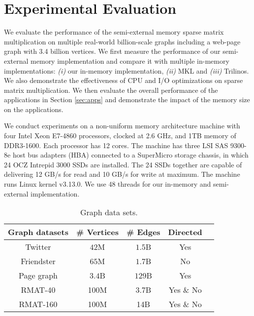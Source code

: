 \section{Experimental Evaluation}

We evaluate the performance of the semi-external memory sparse matrix
multiplication on multiple real-world billion-scale graphs including a web-page
graph with 3.4 billion vertices. We first measure the performance of our
semi-external memory implementation and compare it with multiple in-memory
implementations: \textit{(i)} our in-memory implementation, \textit{(ii)} MKL
and \textit{(iii)} Trilinos. We also demonstrate the effectiveness of
CPU and I/O optimizations on sparse matrix multiplication.
We then evaluate the overall performance of the applications in Section
\ref{sec:apps} and demonstrate the impact of the memory size on the applications.

We conduct experiments on a non-uniform memory architecture machine with
four Intel Xeon E7-4860 processors, clocked at 2.6 GHz, and 1TB memory of
DDR3-1600. Each processor has 12 cores. The machine has three LSI SAS 9300-8e
host bus adapters (HBA) connected to a SuperMicro storage chassis, in which
24 OCZ Intrepid 3000 SSDs are installed. The 24 SSDs together are capable of
delivering 12 GB/s for read and 10 GB/s for write at maximum. The machine runs
Linux kernel v3.13.0. We use 48 threads for our in-memory and semi-external
implementation.

\begin{table}
\begin{center}
\footnotesize
\begin{tabular}{|c|c|c|c|c|}
\hline
Graph datasets & \# Vertices & \# Edges & Directed \\
\hline
Twitter \cite{twitter} & $42$M & $1.5$B & Yes \\
\hline
Friendster \cite{friendster} & $65$M & $1.7$B & No \\
\hline
Page graph \cite{web_graph} & $3.4$B & $129$B & Yes \\
\hline
RMAT-40 \cite{rmat} & 100M & 3.7B & Yes \& No \\
\hline
RMAT-160 \cite{rmat} & 100M & 14B & Yes \& No \\
\hline
\end{tabular}
\normalsize
\end{center}
\caption{Graph data sets.}
\label{graphs}
\end{table}

